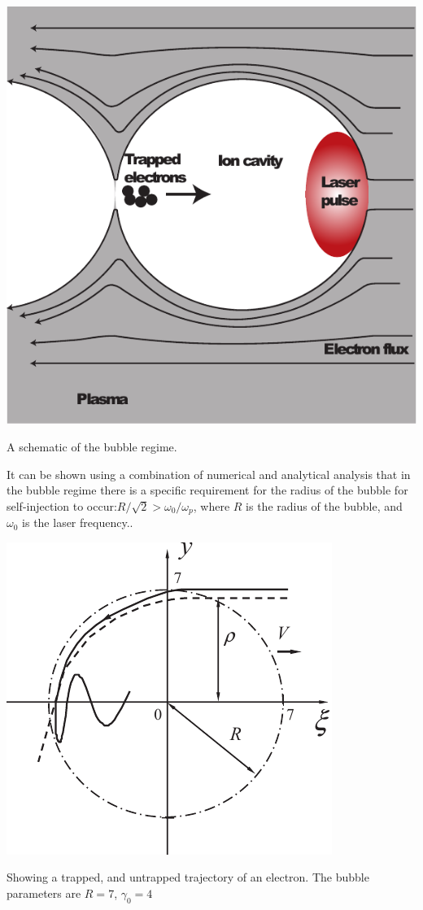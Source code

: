 \documentclass[12pt,letter]{article}
\begin{document}
    \begin{marginfigure}[-70pt]
    \includegraphics[width=\marginparwidth]{../figures/bubbleschem.pdf}
    \caption{A schematic of the bubble
    regime.\cite{genothesis}\label{fig:bubbleschem}}
\end{marginfigure}



    It can be shown using a combination of numerical and analytical analysis that in the bubble regime there is a specific requirement
    for the radius of the bubble for self-injection to occur:$R/\sqrt{2} >
    \omega_0/\omega_p$, where $R$ is the radius of the bubble, and $\omega_0$ is
    the laser frequency.\cite{PhysRevLett.103.175003}. 

    \begin{marginfigure}[70pt]
        \includegraphics[width = \marginparwidth]{../figures/bubbletrap1.pdf}
        \caption{Showing a trapped, and untrapped trajectory of an electron. The
        bubble parameters are $R = 7$, $\gamma_0 = 4$}
\end{marginfigure}
    
\end{document}
